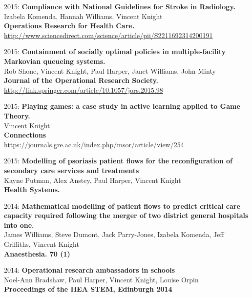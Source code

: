 \documentclass[10pt]{res} %
\begin{document}
\begin{resume}
\begin{etaremune}
\item
2015: \textbf{Compliance with National Guidelines for Stroke in Radiology.}\\
Izabela Komenda, Hannah Williams, Vincent Knight
\\
\textbf{Operations Research for Health Care.}
\\
\url{http://www.sciencedirect.com/science/article/pii/S2211692314200191}
\\

\item
2015: \textbf{Containment of socially optimal policies in multiple-facility Markovian queueing systems.}\\
Rob Shone, Vincent Knight, Paul Harper, Janet Williams, John Minty
\\
\textbf{Journal of the Operational Research Society.}
\\
\url{http://link.springer.com/article/10.1057/jors.2015.98}
\\

\item
2015: \textbf{Playing games: a case study in active learning applied to Game Theory.}\\
Vincent Knight
\\
\textbf{Connections}
\\
\url{https://journals.gre.ac.uk/index.php/msor/article/view/254}
\\

\item
2015: \textbf{Modelling of psoriasis patient flows for the reconfiguration of secondary care services and treatments}\\
Kayne Putman, Alex Anstey, Paul Harper, Vincent Knight
\\
\textbf{Health Systems.}
\\

\item
2014: \textbf{Mathematical modelling of patient flows to predict critical care capacity required following the merger of two district general hospitals into one.}\\
James Williams, Steve Dumont, Jack Parry-Jones, Izabela Komenda, Jeff Griffiths, Vincent Knight
\\
\textbf{Anaesthesia. 70 (1)}
\\

\item
2014: \textbf{Operational research ambassadors in schools}\\
Noel-Ann Bradshaw, Paul Harper, Vincent Knight, Louise Orpin
\\
\textbf{Proceedings of the HEA STEM, Edinburgh 2014}
\\


\end{etaremune}
\end{resume}
\end{document}
